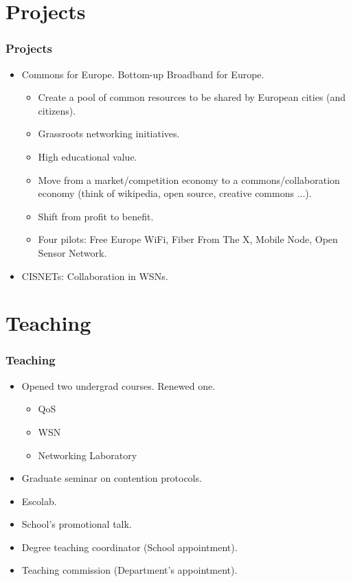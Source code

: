 \documentclass{beamer}
\begin{document}
\section{Projects}
\begin{frame}
  \frametitle{Projects}
      \begin{block}{}
        \begin{itemize}
          \item Commons for Europe. Bottom-up Broadband for Europe.          \begin{itemize}
              \item Create a pool of common resources to be shared by European cities (and citizens).
              \item Grassroots networking initiatives.
              \item High educational value.
              \item Move from a market/competition economy to a commons/collaboration economy (think of wikipedia, open source, creative commons ...).
              \item Shift from profit to benefit.
              \item Four pilots: Free Europe WiFi, Fiber From The X, Mobile Node, Open Sensor Network.
          \end{itemize}
          \item CISNETs: Collaboration in WSNs.
        \end{itemize}
      \end{block}
\end{frame}

\section{Teaching}
\begin{frame}
  \frametitle{Teaching}
      \begin{block}{}
        \begin{itemize}
          \item Opened two undergrad courses. Renewed one.
          \begin{itemize}
              \item QoS
              \item WSN
              \item Networking Laboratory
          \end{itemize}
          \item Graduate seminar on contention protocols.
          \item Escolab.
          \item School's promotional talk.
          \item Degree teaching coordinator (School appointment).
          \item Teaching commission (Department's appointment).
        \end{itemize}
      \end{block}
\end{frame}
\end{document}
